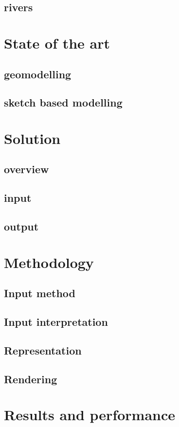 \documentclass[a4paper,10pt]{article}
\begin{document}
\subsection{rivers}


\section{State of the art}
\subsection{geomodelling}
\subsection{sketch based modelling}

\section{Solution}
\subsection{overview}
\subsection{input}
\subsection{output}

\section{Methodology}
\subsection{Input method}
\subsection{Input interpretation}
\subsection{Representation}
\subsection{Rendering}

\section{Results and performance}
\end{document}
